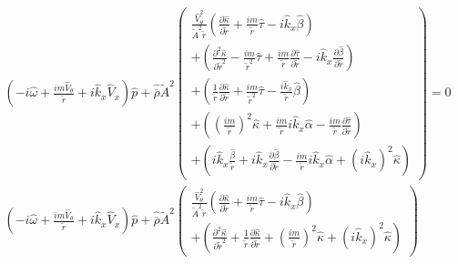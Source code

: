 \begin{eqnarray}
\left(
-i \widehat{\omega}
+ \frac{i m \widehat{V}_{\theta}}{\widetilde{r}}
+i \widehat{k}_x \widehat{V}_x 
\right) 
\widehat{p} 
+
\widehat{\overline{\rho}} \widetilde{A}^2
\left(
\begin{array}{r}
\frac{\widehat{V}_{\theta}^2}{\widetilde{A}^2 \widetilde{r}}
\left(
\frac{\partial \widehat{\kappa}}{\partial \widetilde{r}}
+
\frac{i m}{\widetilde{r}}
\widehat{\tau}
-
i \widehat{k}_x \widehat{\beta}
\right) 
\\
+ 
\left(
\frac{\partial^2 \widehat{\kappa}}{\partial \widetilde{r}^2}
-
\frac{i m}{\widetilde{r}^2}
\widehat{\tau}
+
\frac{i m}{\widetilde{r}}
\frac{\partial \widehat{\tau}}{\partial \widetilde{r}}
-
i \widehat{k}_x 
\frac{\partial \widehat{\beta}}{\partial \widetilde{r}}
\right) 
\\
+ 
\left(
\frac{1}{\widetilde{r}} 
\frac{\partial \widehat{\kappa}}{\partial \widetilde{r}}
+
\frac{i m}{\widetilde{r}^2}
\widehat{\tau}
-
\frac{i \widehat{k}_x}{\widetilde{r}} 
\widehat{\beta}
\right) 
\\
+
\left(
\left(\frac{i m}{\widetilde{r}} \right)^2 \widehat{\kappa}
+
\frac{i m }{\widetilde{r}} 
i \widehat{k}_x \widehat{\alpha}
-
\frac{i m }{\widetilde{r}} 
\frac{\partial \widehat{\tau}}{\partial \widetilde{r}}
\right) 
\\
+ 
\left(
i \widehat{k}_x 
\frac{\widehat{\beta}}{\widetilde{r}}
+
i \widehat{k}_x 
\frac{\partial \widehat{\beta}}{\partial \widetilde{r}}
-
\frac{i m}{\widetilde{r}}
i \widehat{k}_x 
\widehat{\alpha}
+ 
\left(i \widehat{k}_x \right)^2 \widehat{\kappa}
\right) 
\end{array}
\right)
 = 
0
\nonumber
\\
\left(
-i \widehat{\omega}
+ \frac{i m \widehat{V}_{\theta}}{\widetilde{r}}
+i \widehat{k}_x \widehat{V}_x 
\right) 
\widehat{p} 
+
\widehat{\overline{\rho}} \widetilde{A}^2
\left(
\begin{array}{r}
\frac{\widehat{V}_{\theta}^2}{\widetilde{A}^2 \widetilde{r}}
\left(
\frac{\partial \widehat{\kappa}}{\partial \widetilde{r}}
+
\frac{i m}{\widetilde{r}}
\widehat{\tau}
-
i \widehat{k}_x \widehat{\beta}
\right) 
\\
+ 
\left(
\frac{\partial^2 \widehat{\kappa}}{\partial \widetilde{r}^2}
+ 
\frac{1}{\widetilde{r}} 
\frac{\partial \widehat{\kappa}}{\partial \widetilde{r}}
+
\left(\frac{i m}{\widetilde{r}} \right)^2 \widehat{\kappa}
+ 
\left(i \widehat{k}_x \right)^2 \widehat{\kappa}
\right)
\end{array}
\right)

\end{eqnarray}

